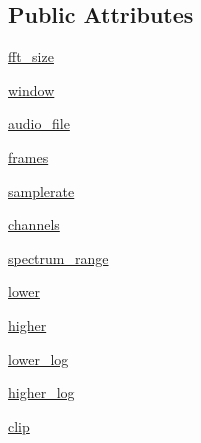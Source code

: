 \subsection*{Public Attributes}
\begin{DoxyCompactItemize}
\item 
\hyperlink{classconcertapp_1_1audio_1_1waveform_1_1_audio_processor_abab70ccae8f197d91d34e78a01f4daf6}{fft\_\-size}
\item 
\hyperlink{classconcertapp_1_1audio_1_1waveform_1_1_audio_processor_adce38070119c56623dc9e9eeb95a6b44}{window}
\item 
\hyperlink{classconcertapp_1_1audio_1_1waveform_1_1_audio_processor_ac452f88cdd923fd42561d05d503e338b}{audio\_\-file}
\item 
\hyperlink{classconcertapp_1_1audio_1_1waveform_1_1_audio_processor_acfe9dae6f9c6f64f9d51859223304d74}{frames}
\item 
\hyperlink{classconcertapp_1_1audio_1_1waveform_1_1_audio_processor_a3cc00456051b901ef1ad6f8702e4b49c}{samplerate}
\item 
\hyperlink{classconcertapp_1_1audio_1_1waveform_1_1_audio_processor_adea4bc5175e7ef1a39f5fc04ea560d80}{channels}
\item 
\hyperlink{classconcertapp_1_1audio_1_1waveform_1_1_audio_processor_a4df8c0c3183f8fec892735f8b673c58c}{spectrum\_\-range}
\item 
\hyperlink{classconcertapp_1_1audio_1_1waveform_1_1_audio_processor_a7d732e59d46bf8e9798f3aa200b9d982}{lower}
\item 
\hyperlink{classconcertapp_1_1audio_1_1waveform_1_1_audio_processor_a1bf522437d5692a917e972dab6f64a1f}{higher}
\item 
\hyperlink{classconcertapp_1_1audio_1_1waveform_1_1_audio_processor_a86583ba97dace9f23fc1104c7ea7d47a}{lower\_\-log}
\item 
\hyperlink{classconcertapp_1_1audio_1_1waveform_1_1_audio_processor_aa3843ad42db5b06bde44aa040879c4b8}{higher\_\-log}
\item 
\hyperlink{classconcertapp_1_1audio_1_1waveform_1_1_audio_processor_a564b093101aa472e53a23b9797ed8473}{clip}
\end{DoxyCompactItemize}


